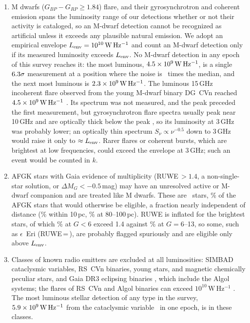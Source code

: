 \documentclass[linenumbers]{aastex702}
\newcommand{\WHz}{\mathrm{W\,Hz^{-1}}}
\begin{document}
\begin{enumerate}
\item M dwarfs ($G_{BP}-G_{RP}\ge1.84$) flare, and their gyrosynchrotron and coherent emission spans the luminosity range of our detections whether or not their activity is cataloged, so an M-dwarf detection cannot be recognized as artificial unless it exceeds any plausible natural emission. We adopt an empirical envelope $L_{\rm env}=10^{10}\,\WHz$ and count an M-dwarf detection only if its measured luminosity exceeds $L_{\rm env}$. No M-dwarf detection in any epoch of this survey reaches it: the most luminous, $\MaxMdwL\,\WHz$, is a single $6.3\sigma$ measurement at a position where the noise is \MaxMdwSigRatio\ times the median, and the next most luminous is $\NextMdwL\,\WHz$. The luminous 15\,GHz incoherent flare observed from the young M-dwarf binary DG~CVn reached $\LDGCVn\,\WHz$ \citep{Fender2015}. Its spectrum was not measured, and the peak preceded the first measurement, but gyrosynchrotron flare spectra usually peak near 10\,GHz and are optically thick below the peak \citep{Osten2016}, so its luminosity at 3\,GHz was probably lower; an optically thin spectrum $S_\nu\propto\nu^{-0.5}$ down to 3\,GHz would raise it only to $\approx L_{\rm env}$. Rarer flares or coherent bursts, which are brightest at low frequencies, could exceed the envelope at 3\,GHz; such an event would be counted in $k$.

\item AFGK stars with Gaia evidence of multiplicity (RUWE\,$>1.4$, a non-single-star solution, or $\Delta M_G<-0.5$\,mag) may have an unresolved active or M-dwarf companion and are treated like M dwarfs. These are \NAFGKMult\ stars, \PctAFGKMult\% of the AFGK stars that would otherwise be eligible, a fraction nearly independent of distance (\PctMultAFGKTen\% within 10\,pc, \PctMultAFGKHundred\% at 80--100\,pc). RUWE is inflated for the brightest stars, of which \PctRuweBright\% at $G<6$ exceed 1.4 against \PctRuweFaint\% at $G=6$--13, so some, such as $\epsilon$~Eri (RUWE\,=\,\EpsEriRUWE), are probably flagged spuriously and are eligible only above $L_{\rm env}$.

\item Classes of known radio emitters are excluded at all luminosities: SIMBAD cataclysmic variables, RS~CVn binaries, young stars, and magnetic chemically peculiar stars, and Gaia DR3 eclipsing binaries \citep[\NEBall\ in the sample;][]{Mowlavi2023}, which include the Algol systems; the flares of RS~CVn and Algol binaries can exceed $10^{10}\,\WHz$ \citep{Gudel2002}. The most luminous stellar detection of any type in the survey, $\MaxStarL\,\WHz$ from the cataclysmic variable \MaxStarName\ in one epoch, is in these classes.


\end{enumerate}
\end{document}
